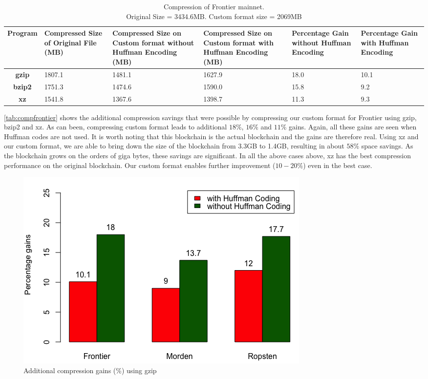 \begin{table}[H]
	\centering
\captionsetup{justification=centering}
\begin{tabular}{ >{\bfseries}c| p{2cm} | p{2cm} | p{2cm} | p{1.5cm} | p{1.5cm} }
	Program & {Compressed Size of Original File (MB)} & {Compressed Size on Custom format without Huffman Encoding (MB)} & {Compressed Size on Custom format with Huffman Encoding (MB)} &Percentage Gain without Huffman Encoding & Percentage Gain with Huffman Encoding\\
  \hline
  gzip  & 1807.1 & 1481.1 & 1627.9 & 18.0 & 10.1 \\
  bzip2 & 1751.3 & 1474.6 & 1590.0 & 15.8 & 9.2 \\
  xz   & 1541.8 & 1367.6 & 1398.7 & 11.3  & 9.3 \\
\end{tabular}
\caption{Compression of Frontier mainnet. \\ Original Size = 3434.6MB. Custom format size = 2069MB}
\label{tab:compfrontier}
\end{table}
\autoref{tab:compfrontier} 
shows the additional compression savings that were possible by compressing 
our custom format for Frontier  using gzip, bzip2 and xz.
As can been, compressing custom format leads to additional $18\%$, $16\%$ and $11\%$  gains. Again, all these gains are seen when
Huffman codes are not used. It is worth noting that this blockchain
is the actual \eth{} blockchain and the gains are therefore real.
Using xz and our custom format, we are able to
bring down the size of the blockchain from 3.3GB to 1.4GB, 
resulting in about $58\%$ space savings.
As the blockchain grows on the orders of giga bytes, these savings are significant.
In all the above cases above, xz has the best compression performance on the original blockchain. 
Our custom format enables further improvement ($10-20\%$) even in the best case.

\begin{figure}[H]
	\includegraphics[scale=0.45]{plots/gzip}
	\caption{Additional compression gains (\%) using gzip}
	\label{fig:gzip}
\end{figure}

